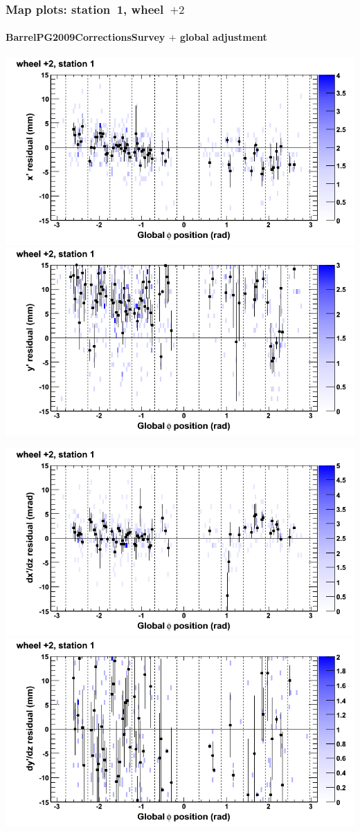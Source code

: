 \documentclass[compress]{beamer}
\begin{document}
\begin{frame}
\frametitle{Map plots: station~1, wheel~$+2$}
\framesubtitle{BarrelPG2009CorrectionsSurvey $+$ global adjustment}
\includegraphics[width=0.5\linewidth]{mapplots_re01/DTvsphi_st1whE_x.png}
\includegraphics[width=0.5\linewidth]{mapplots_re01/DTvsphi_st1whE_y.png}

\includegraphics[width=0.5\linewidth]{mapplots_re01/DTvsphi_st1whE_dxdz.png}
\includegraphics[width=0.5\linewidth]{mapplots_re01/DTvsphi_st1whE_dydz.png}
\end{frame}
\end{document}
